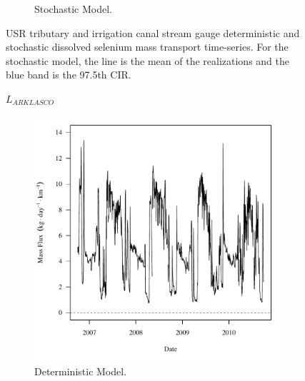 \begin{linenumbers}
\begin{landscape}
\begin{figure}
\begin{subfigure}{0.7\textwidth}
			\caption{Stochastic Model.}
		\end{subfigure}
		\caption[USR tributary and irrigation canal stream gauge deterministic and stochastic dissolved selenium mass transport time-series.]{USR tributary and irrigation canal stream gauge deterministic and stochastic dissolved selenium mass transport time-series.  For the stochastic model, the line is the mean of the realizations and the blue band is the 97.5th CIR.}
		\label{fig:massTrans_USR}
	\end{figure}
\end{landscape}
\subfiguremid
\begin{landscape}
	\begin{figure}
		$ \displaystyle L_{ARKLASCO} $
		\begin{subfigure}{0.7\textwidth}
			\centering
			\includegraphics[width=\tableCustomSize]{"Figures/Results_USR/Deterministic/f U201"}
			\caption{Deterministic Model.}
		\end{subfigure}%
		\begin{subfigure}{0.7\textwidth}
			\centering

\end{subfigure}
\end{figure}
\end{landscape}
\end{linenumbers}
